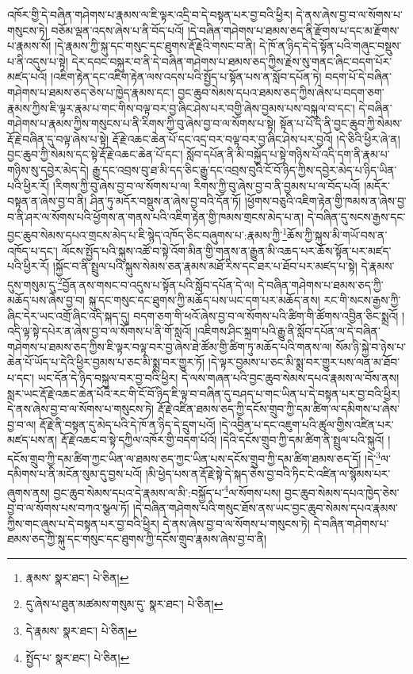 འཁོར་གྱི་དེ་བཞིན་གཤེགས་པ་རྣམས་ལ་ཇི་ལྟར་འདྲི་བ་དེ་བསྟན་པར་བྱ་བའི་ཕྱིར། དེ་ནས་ཞེས་བྱ་བ་ལ་སོགས་པ་གསུངས་ཏེ། བཅོམ་ལྡན་འདས་ཞེས་པ་ནི་བོད་པའོ། །དེ་བཞིན་གཤེགས་པ་ཐམས་ཅད་ནི་རྫོགས་པ་དང་མ་རྫོགས་པ་རྣམས་སོ། །དེ་རྣམས་ཀྱི་སྐུ་དང་གསུང་དང་ཐུགས་རྡོ་རྗེའི་གསང་བ་ནི། དེ་ཁོ་ན་ཉིད་དེ་དེ་སྟོན་པའི་གཞུང་བསྡུས་པ་ནི་འདུས་པ་སྟེ། དེར་དབང་བསྐུར་བ་ནི་དེ་བཞིན་གཤེགས་པ་ཐམས་ཅད་ཀྱིས་རྗེས་སུ་གནང་ཞིང་བདག་པོར་མཛད་པའོ། །འཇིག་རྟེན་དང་འཇིག་རྟེན་ལས་འདས་པའི་སྤྱོད་པ་སྟོན་པས་ན་སློབ་དཔོན་ཏེ། བདག་པོ་དེ་བཞིན་གཤེགས་པ་ཐམས་ཅད་ཅེས་པ་ཁྱེད་རྣམས་དང་། བྱང་ཆུབ་སེམས་དཔའ་ཐམས་ཅད་ཀྱིས་ཞེས་པ་བདག་ཅག་རྣམས་ཀྱིས་ཇི་ལྟར་རྣམ་པ་གང་གིས་བལྟ་བར་བྱ་ཞིང་ཤེས་པར་བགྱི་ཞེས་བྱམས་པས་བསྐུལ་བ་དང་། དེ་བཞིན་གཤེགས་པ་རྣམས་ཀྱིས་གསུངས་པ་ནི་རིགས་ཀྱི་བུ་ཞེས་བྱ་བ་ལ་སོགས་པ་སྟེ། སྟོན་པ་པོ་དེ་ནི་བྱང་ཆུབ་ཀྱི་སེམས་རྡོ་རྗེ་བཞིན་དུ་བལྟ་ཞེས་པ་སྟེ། རྡོ་རྗེ་འཆང་ཆེན་པོ་དང་འདྲ་བར་བལྟ་བར་བྱ་ཞིང་ཤེས་པར་བྱའོ། །དེ་ཅིའི་ཕྱིར་ཞེ་ན། བྱང་ཆུབ་ཀྱི་སེམས་དང་སྟེ་རྡོ་རྗེ་འཆང་ཆེན་པོ་དང་། སློབ་དཔོན་ནི་མི་བསྐྱོད་པ་སྟེ་གཉིས་པོ་འདི་དག་ནི་རྣམ་པ་གཉིས་སུ་དབྱེར་མེད་དེ། རྒྱུ་དང་འབྲས་བུ་ཐ་མི་དད་ཅིང་རྒྱུ་དང་འབྲས་བུའི་ངོ་བོ་ཉིད་ཀྱིས་དབྱེར་མེད་པ་ཉིད་ཡིན་པའི་ཕྱིར་རོ། །རིགས་ཀྱི་བུ་ཞེས་བྱ་བ་ལ་སོགས་པ་ལ། རིགས་ཀྱི་བུ་ཞེས་བྱ་བ་ནི་བྱམས་པ་ལ་བོད་པའོ། །མདོར་བསྟན་ན་ཞེས་བྱ་བ་ནི། ཤིན་ཏུ་མདོར་བསྡུས་ན་ཞེས་བྱ་བའི་དོན་ཏོ། །ཕྱོགས་བཅུའི་འཇིག་རྟེན་གྱི་ཁམས་ན་ཞེས་བྱ་བ་ནི་ཤར་ལ་སོགས་པའི་ཕྱོགས་ན་གནས་པའི་འཇིག་རྟེན་གྱི་ཁམས་གྲངས་མེད་པ་ན། དེ་བཞིན་དུ་སངས་རྒྱས་དང་བྱང་ཆུབ་སེམས་དཔའ་གྲངས་མེད་པ་ཇི་སྙེད་འཁོད་ཅིང་བཞུགས་པ་:རྣམས་ཀྱི་\footnote{རྣམས་  སྣར་ཐང་།  པེ་ཅིན། }ཆོས་ཀྱི་སྐུས་མི་གཡོ་བས་ན་འཁོད་པ་དང་། ལོངས་སྤྱོད་པའི་སྐུས་འཚོ་བ་སྟེ་འོག་མིན་གྱི་གནས་ན་རྒྱུན་མི་འཆད་པར་ཆོས་སྟོན་པར་མཛད་པའི་ཕྱིར་རོ། །སྐྱོང་བ་ནི་སྤྲུལ་པའི་སྐུས་སེམས་ཅན་རྣམས་མཐོ་རིས་དང་ཐར་པ་ཐོབ་པར་མཛད་པ་སྟེ། དེ་རྣམས་དུས་གསུམ་དུ་\footnote{དུ་ཞེས་པ་ཐུན་མཚམས་གསུམ་དུ་  སྣར་ཐང་།  པེ་ཅིན། }བྱོན་ནས་གསང་བ་འདུས་པ་སྟོན་པའི་སློབ་དཔོན་དེ་ལ། དེ་བཞིན་གཤེགས་པ་ཐམས་ཅད་ཀྱི་མཆོད་པས་ཞེས་བྱ་བ། སྐུ་དང་གསུང་དང་ཐུགས་ཀྱི་མཆོད་པས་ཡང་དག་པར་མཆོད་ནས། རང་གི་སངས་རྒྱས་ཀྱི་ཞིང་དེར་ཡང་འགྲོ་ཞིང་འདི་སྐད་དུ། བདག་ཅག་གི་ཕའོ་ཞེས་བྱ་བ་ལ་སོགས་པའི་ཚིག་གི་ཚོགས་འབྱིན་ཅིང་སྨྲའོ། །འདི་ལྟ་སྟེ་དཔེར་ན་ཞེས་བྱ་བ་ལ་སོགས་པ་ནི་གོ་སླའོ། །འཇིགས་ཤིང་སྐྲག་པའི་རྒྱུ་ནི་སློབ་དཔོན་ལ་དེ་བཞིན་གཤེགས་པ་ཐམས་ཅད་ཀྱིས་ཇི་ལྟར་བལྟ་བར་བྱ་ཞེས་ཐེ་ཚོམ་གྱི་ཚིག་ཏུ་མཆོད་པའི་གནས་ལ། སོམ་ཉི་སྐྱེ་བ་ཉེས་པ་ཆེན་པོ་ཡོད་པ་དེའི་ཕྱིར་བྱམས་པ་ཅང་མི་སྨྲ་བར་གྱུར་ཏོ། །དེ་ལྟར་བྱམས་པ་ཅང་མི་སྨྲ་བར་གྱུར་པས་ལན་མ་ཐོབ་པ་དང་། ཡང་དོན་དེ་ཉིད་བསྐུལ་བར་བྱ་བའི་ཕྱིར། དེ་ལས་གཞན་པའི་བྱང་ཆུབ་སེམས་དཔའ་རྣམས་ལ་བོས་ནས། སླར་ཡང་རྡོ་རྗེ་འཆང་ཆེན་པོའི་རང་གི་ངོ་བོ་ཉིད་ཇི་ལྟ་བ་བཞིན་དུ་བཤད་པ་གང་ཡིན་པ་དེ་བསྟན་པར་བྱ་བའི་ཕྱིར། དེ་ནས་ཞེས་བྱ་བ་ལ་སོགས་པ་གསུངས་ཏེ། རྡོ་རྗེ་འཛིན་ཐམས་ཅད་ཀྱི་དངོས་གྲུབ་ཀྱི་དམ་ཚིག་ལ་དམིགས་པ་ཞེས་བྱ་བ་ལ། རྡོ་རྗེ་ནི་བསྟན་དུ་མེད་པའི་དེ་ཁོ་ན་ཉིད་དེ་དྲུག་པའོ། །དེ་འབྱིན་པ་དང་འཇུག་པའི་ཚུལ་གྱིས་འཛིན་པར་མཛད་པས་ན། རྡོ་རྗེ་འཆང་བ་སྟེ་དཀྱིལ་འཁོར་གྱི་བདག་པོའོ། །དེའི་དངོས་གྲུབ་ཀྱི་དམ་ཚིག་ནི་སྤྲུལ་པའི་སྐུའོ། །དངོས་གྲུབ་ཀྱི་དམ་ཚིག་ཀྱང་ཡིན་ལ་ཐམས་ཅད་ཀྱང་ཡིན་པས་དངོས་གྲུབ་ཀྱི་དམ་ཚིག་ཐམས་ཅད་དོ། །དེ་\footnote{དེ་རྣམས་  སྣར་ཐང་།  པེ་ཅིན། }ལ་དམིགས་པ་ནི་མངོན་སུམ་དུ་བྱས་པའོ། །མི་ཕྱེད་པས་ན་རྡོ་རྗེ་སྟེ་དེ་སྐད་ཅེས་བྱ་བའི་ཏིང་ངེ་འཛིན་ལ་སྙོམས་པར་ཞུགས་ནས། བྱང་ཆུབ་སེམས་དཔའ་དེ་རྣམས་ལ་མི་:བསྐྱོད་པ་\footnote{སྤྱོད་པ་  སྣར་ཐང་།  པེ་ཅིན། }ལ་སོགས་པས། བྱང་ཆུབ་སེམས་དཔའ་ཁྱེད་ཅེས་བྱ་བ་ལ་སོགས་པས་བཀའ་སྩལ་ཏོ། །དེ་བཞིན་གཤེགས་པའི་གསུང་ཐོས་ནས་ཡང་བྱང་ཆུབ་སེམས་དཔའ་རྣམས་ཀྱིས་གང་ཞུས་པ་དེ་བསྟན་པར་བྱ་བའི་ཕྱིར། དེ་ནས་ཞེས་བྱ་བ་ལ་སོགས་པ་གསུངས་ཏེ། དེ་བཞིན་གཤེགས་པ་ཐམས་ཅད་ཀྱི་སྐུ་དང་གསུང་དང་ཐུགས་ཀྱི་དངོས་གྲུབ་རྣམས་ཞེས་བྱ་བ་ནི། 